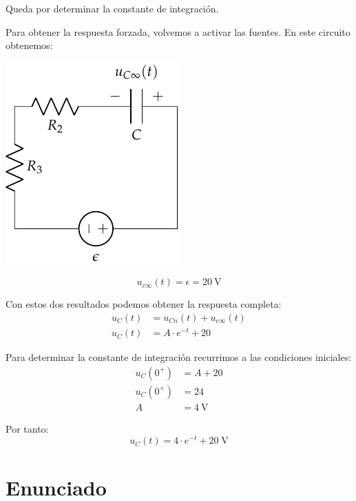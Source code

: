 \vspace{4mm}
Queda por determinar la constante de integración.

\vspace{3mm}
Para obtener la respuesta forzada, volvemos a activar las fuentes. En
este circuito obtenemos:

\begin{minipage}{0.3\textwidth}
  \includegraphics{figuras/FM_4_3_forzada}
\end{minipage}
\begin{minipage}{0.7\textwidth}
  \begin{equation*}
    u_{c\infty}(t) = \epsilon = \SI{20}{\volt}
  \end{equation*}
\end{minipage}

\vspace{3mm}
Con estos dos resultados podemos obtener la respuesta completa:
\begin{align*}
  u_C(t) &= u_{Cn}(t) + u_{c\infty}(t)\\
  u_C(t) &= A \cdot e^{-t} + 20
\end{align*}

\vspace{2mm}
Para determinar la constante de integración recurrimos a las
condiciones iniciales:
\begin{align*}
  u_C(0^+) &= A + 20\\
  u_C(0^+) &= 24\\
  A &= \SI{4}{\volt}
\end{align*}

Por tanto:
\begin{equation*}
  u_C(t) = 4 \cdot e^{-t} + 20 \;\si{\volt}
\end{equation*}

\section{Enunciado}

